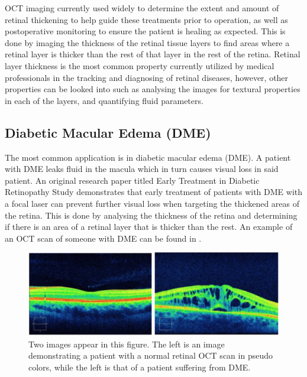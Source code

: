 OCT imaging currently used widely to determine the extent and amount of
retinal thickening to help guide these treatments prior to operation, as well as postoperative 
monitoring to ensure the patient is healing as expected.
This is done by imaging the thickness of the retinal tissue layers to find areas where a
retinal layer is thicker than the rest of that layer in the rest of the retina.  Retinal
layer thickness is the most common property currently utilized by medical professionals
in the tracking and diagnosing of retinal diseases, however, other properties can be looked
into such as analysing the images for textural properties in each of the layers, and quantifying
fluid parameters. \cite{mbib_4}

\subsection{Diabetic Macular Edema (DME)}
The most common application is in diabetic macular edema (DME). A patient with DME  leaks
fluid in the macula which in turn causes visual loss in said patient.  An original research
paper titled Early Treatment in Diabetic Retinopathy Study demonstrates that early treatment
of patients with DME with a focal laser can prevent further visual loss when targeting the
thickened areas of the retina. \cite{mbib_4}  This is done by analysing the thickness of the
retina and determining if there is an area of a retinal layer that is thicker than the rest.
An example of an OCT scan of someone with DME can be found in .

\begin{figure}[htbp]
\centering
\includegraphics{figures/morgan_5}
\caption{Two images appear in this figure.  The left is an image demonstrating a patient with a normal retinal OCT scan in pseudo colors, while the left is that of a patient suffering from DME. \cite{mbib_10} }
\label{fig:m_5}
\end{figure}

